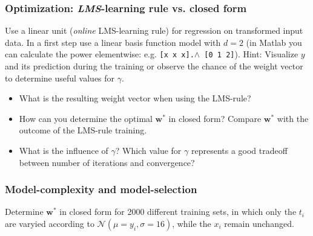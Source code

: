 \documentclass[a4]{article}
\begin{document}
\subsubsection{Optimization: \emph{LMS}-learning rule vs. closed form}

Use a linear unit (\emph{online} LMS-learning rule) for regression on transformed input data. In a first step use a linear basis function model with $d=2$ (in Matlab you can calculate the power elementwise: e.g. \texttt{[x x x].$\wedge$ [0 1 2]}). Hint: Visualize $y$ and its prediction during the training or observe the chance of the weight vector to determine useful values for $\gamma$.
\vspace{2mm}

\begin{itemize}
\item What is the resulting weight vector when using the LMS-rule?
\item How can you determine the optimal ${\mathbf w}^*$ in closed form? Compare ${\mathbf w}^*$ with the outcome of the LMS-rule training.
\item What is the influence of $\gamma$? Which value for $\gamma$ represents a good tradeoff between number of iterations and convergence? 
\end{itemize}

\subsubsection{Model-complexity and model-selection}
Determine ${\mathbf w}^*$ in closed form for 2000 different training sets, in which only the $t_i$ are varyied according to $\mathcal{N}(\mu = y_i,\sigma = 16)$, while the $x_i$ remain unchanged. 
\end{document}
